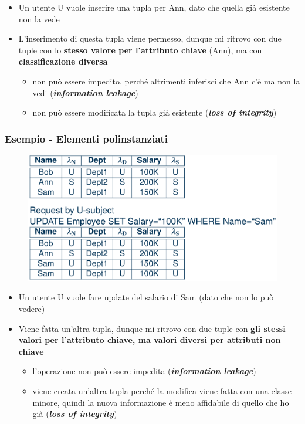 \documentclass{report}
\begin{document}
\begin{itemize}
    \item Un utente U vuole inserire una tupla per Ann, dato che quella già esistente non la vede 
    \item L'inserimento di questa tupla viene permesso, dunque mi ritrovo con due tuple con lo \textbf{stesso 
    valore per l'attributo chiave} (Ann), ma con \textbf{classificazione diversa}
    \begin{itemize}
        \item non può essere impedito, perché altrimenti inferisci che Ann c'è ma non la vedi (\textbf{\textit{information leakage}})
        \item non può essere modificata la tupla già esistente (\textit{\textbf{loss of integrity}})
    \end{itemize}
\end{itemize}

\subsubsection{Esempio - Elementi polinstanziati}

\begin{figure}[H]
    \centering
    \includegraphics[width=0.8\linewidth]{images/poly2.png}
\end{figure}

\begin{itemize}
    \item Un utente U vuole fare update del salario di Sam (dato che non lo può vedere)
    \item Viene fatta un'altra tupla, dunque mi ritrovo con due tuple con \textbf{gli stessi valori per 
    l'attributo chiave, ma valori diversi per attributi non chiave}
    \begin{itemize}
        \item l'operazione non può essere impedita (\textit{\textbf{information leakage}})
        \item viene creata un'altra tupla perché la modifica viene fatta con una classe minore, 
        quindi la nuova informazione è meno affidabile di quello che ho già (\textit{\textbf{loss of integrity}})
    \end{itemize}
    
\end{itemize}
\end{document}
